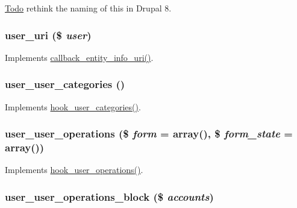 \begin{Desc}
\item[\hyperlink{todo__todo000027}{Todo}]rethink the naming of this in Drupal 8. \end{Desc}
\hypertarget{user_8module_aa9b0c1a8792930f545bda1c85a085e19}{
\subsubsection[{user\_\-uri}]{\setlength{\rightskip}{0pt plus 5cm}user\_\-uri (\$ {\em user})}}
\label{user_8module_aa9b0c1a8792930f545bda1c85a085e19}
Implements \hyperlink{group__callbacks_ga42bf4e69ee32b2bc99d0d774d4917254}{callback\_\-entity\_\-info\_\-uri()}. \hypertarget{user_8module_a7c04b1a53be3ea791a529a14d8f129b7}{
\subsubsection[{user\_\-user\_\-categories}]{\setlength{\rightskip}{0pt plus 5cm}user\_\-user\_\-categories ()}}
\label{user_8module_a7c04b1a53be3ea791a529a14d8f129b7}
Implements \hyperlink{group__hooks_ga166a3fe9d203a99560d10413a880ed08}{hook\_\-user\_\-categories()}. \hypertarget{user_8module_a06d9d99e165bcd0da93901cee90158f5}{
\subsubsection[{user\_\-user\_\-operations}]{\setlength{\rightskip}{0pt plus 5cm}user\_\-user\_\-operations (\$ {\em form} = {\ttfamily array()}, \/  \$ {\em form\_\-state} = {\ttfamily array()})}}
\label{user_8module_a06d9d99e165bcd0da93901cee90158f5}
Implements \hyperlink{group__hooks_ga1b2c2630f79b64b0673d0a9a0983f447}{hook\_\-user\_\-operations()}. \hypertarget{user_8module_a956597acb38e2078f714d140fe54443c}{
\subsubsection[{user\_\-user\_\-operations\_\-block}]{\setlength{\rightskip}{0pt plus 5cm}user\_\-user\_\-operations\_\-block (\$ {\em accounts})}}
